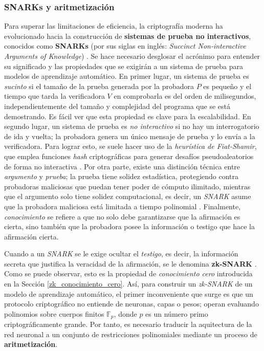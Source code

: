 \documentclass[a4paper, 11pt]{article}
\begin{document}
\subsubsection{SNARKs y aritmetización} \label{snarks_aritmetizacion}

Para superar las limitaciones de eficiencia, la criptografía moderna ha evolucionado hacia la
construcción de \textbf{sistemas de prueba no interactivos}, conocidos como \textbf{SNARKs} (por sus
siglas en inglés: \textit{Succinct Non-interactive Arguments of Knowledge}) \cite[Capítulo~1]{thaler2022proofs}.
Se hace necesario desglosar el acrónimo para entender su significado y las propiedades que se exigirán
a un sistema de prueba para modelos de aprendizaje automático. En primer lugar, un sistema de prueba
es \textit{sucinto} si el tamaño de la prueba generada por la probadora $P$ es pequeño y el tiempo
que tarda la verificadora $V$ en comprobarla es del orden de milisegundos, independientemente del
tamaño y complejidad del programa que se está demostrando. Es fácil ver que esta propiedad es clave
para la escalabilidad. En segundo lugar, un sistema de prueba es \textit{no interactivo} si no hay
un interrogatorio de ida y vuelta; la probadora genera un único mensaje de prueba y lo envía a la
verificadora. Para lograr esto, se suele hacer uso de la \textit{heurística de Fiat-Shamir}, que
emplea funciones \textit{hash} criptográficas para generar desafíos pseudoaleatorios de forma no
interactiva \cite{fiat1987how}. Por otra parte, existe una distinción técnica entre \textit{argumento}
y \textit{prueba}; la prueba tiene solidez estadística, protegiendo contra probadoras maliciosas que
puedan tener poder de cómputo ilimitado, mientras que el argumento solo tiene solidez computacional,
es decir, un \textit{SNARK} asume que la probadora maliciosa está limitada a tiempo polinomial
\cite[Capítulo~1]{thaler2022proofs}. Finalmente, \textit{conocimiento} se refiere a que no solo debe
garantizarse que la afirmación es cierta, sino también que la probadora posee la información o testigo
que hace la afirmación cierta.

Cuando a un \textit{SNARK} se le exige ocultar el \textit{testigo}, es decir, la información secreta
que justifica la veracidad de la afirmación, se le denomina \textbf{zk-SNARK} \cite[Capítulo~1]{thaler2022proofs}.
Como se puede observar, esto es la propiedad de \textit{conocimiento cero} introducida en la Sección
\ref{zk_conocimiento_cero}. Así, para construir un \textit{zk-SNARK} de un modelo de aprendizaje
automático, el primer inconveniente que surge es que un protocolo criptográfico no entiende de neuronas,
capas o pesos; operan evaluando polinomios sobre cuerpos finitos $\mathbb{F}_p$, donde $p$ es un número
primo criptográficamente grande. Por tanto, es necesario traducir la aquitectura de la red neuronal
a un conjunto de restricciones polinomiales mediante un proceso de \textbf{aritmetización}.
\end{document}
